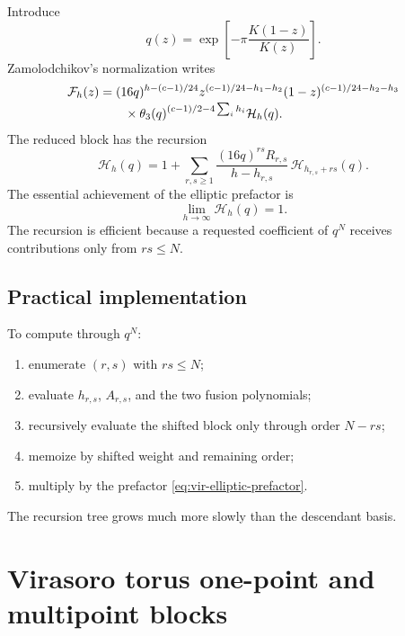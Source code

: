 \documentclass[11pt]{article}
\newcommand{\F}{\mathcal F}
\newcommand{\Hh}{\mathcal H}
\begin{document}
Introduce
\begin{equation}
 q(z)=\exp\!\left[-\pi\frac{K(1-z)}{K(z)}\right].
 \label{eq:elliptic-nome}
\end{equation}
Zamolodchikov's normalization writes
\begin{align}
 \F_h(z)
 &=
 (16q)^{h-(c-1)/24}
 z^{(c-1)/24-h_1-h_2}
 (1-z)^{(c-1)/24-h_2-h_3}
 \notag\\[-0.2em]
 &\qquad\times
 \theta_3(q)^{(c-1)/2-4\sum_i h_i}
 \Hh_h(q).
 \label{eq:vir-elliptic-prefactor}
\end{align}
The reduced block has the recursion
\begin{equation}
 \boxed{
 \Hh_h(q)
 =
 1+
 \sum_{r,s\ge1}
 \frac{(16q)^{rs}R_{r,s}}
      {h-h_{r,s}}\,
 \Hh_{h_{r,s}+rs}(q).}
 \label{eq:vir-elliptic-recursion}
\end{equation}
The essential achievement of the elliptic prefactor is
\begin{equation}
 \lim_{h\to\infty}\Hh_h(q)=1.
 \label{eq:vir-large-h-seed}
\end{equation}
The recursion is efficient because a requested coefficient of \(q^N\)
receives contributions only from \(rs\le N\).

\subsection{Practical implementation}

To compute through \(q^N\):
\begin{enumerate}
 \item enumerate \((r,s)\) with \(rs\le N\);
 \item evaluate \(h_{r,s}\), \(A_{r,s}\), and the two fusion polynomials;
 \item recursively evaluate the shifted block only through order \(N-rs\);
 \item memoize by shifted weight and remaining order;
 \item multiply by the prefactor \eqref{eq:vir-elliptic-prefactor}.
\end{enumerate}
The recursion tree grows much more slowly than the descendant basis.

\section{Virasoro torus one-point and multipoint blocks}
\label{sec:vir-torus}
\end{document}
